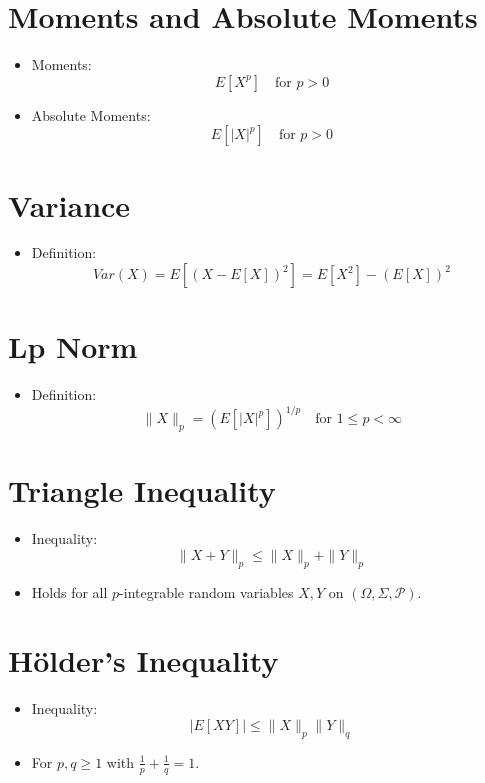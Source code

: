 \documentclass{article}
\begin{document}
\section*{Moments and Absolute Moments}
\begin{itemize}
    \item Moments: 
    \[
    E[X^p] \quad \text{for } p > 0
    \]
    \item Absolute Moments:
    \[
    E[|X|^p] \quad \text{for } p > 0
    \]
\end{itemize}

\section*{Variance}
\begin{itemize}
    \item Definition:
    \[
    Var(X) = E[(X - E[X])^2] = E[X^2] - (E[X])^2
    \]
\end{itemize}

\section*{Lp Norm}
\begin{itemize}
    \item Definition:
    \[
    \|X\|_p = (E[|X|^p])^{1/p} \quad \text{for } 1 \leq p < \infty
    \]
\end{itemize}

\section*{Triangle Inequality}
\begin{itemize}
    \item Inequality:
    \[
    \|X + Y\|_p \leq \|X\|_p + \|Y\|_p
    \]
    \item Holds for all $p$-integrable random variables $X, Y$ on $(\Omega, \Sigma, \mathcal{P})$.
\end{itemize}

\section*{Hölder's Inequality}
\begin{itemize}
    \item Inequality:
    \[
    |E[XY]| \leq \|X\|_p \|Y\|_q
    \]
    \item For $p, q \geq 1$ with $\frac{1}{p} + \frac{1}{q} = 1$.
\end{itemize}
\end{document}
